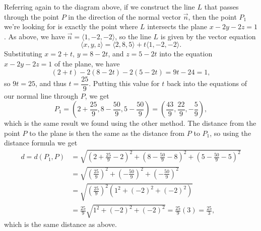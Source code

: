 \documentclass[12pt]{article}
\begin{document}
\begin{enumerate}
\begin{enumerate}
Referring again to the diagram above, if we construct the line $L$ that passes through the point $P$ in the direction of the normal vector $\vec{n}$, then the point $P_1$ we're looking for is exactly the point where $L$ intersects the plane $x-2y-2z=1$. As above, we have $\vec{n} = \langle 1, -2, -2\rangle$, so the line $L$ is given by the vector equation
\[
 \langle x, y, z\rangle = \langle 2, 8, 5\rangle + t\langle 1, -2, -2\rangle.
\]
Substituting $x=2+t$, $y=8-2t$, and $z=5-2t$ into the equation $x-2y-2z=1$ of the plane, we have
\[
 (2+t)-2(8-2t)-2(5-2t) = 9t-24=1,
\]
so $9t=25$, and thus $t=\dfrac{25}{9}$. Putting this value for $t$ back into the equations of our normal line through $P$, we get
\[
 P_1 = \left(2+\frac{25}{9},8-\frac{50}{9}, 5-\frac{50}{9}\right) = \left(\frac{43}{9},\frac{22}{9},-\frac{5}{9}\right),
\]
which is the same result we found using the other method. The distance from the point $P$ to the plane is then the same as the distance from $P$ to $P_1$, so using the distance formula we get
\begin{align*}
 d = d(P_1,P) &= \sqrt{\left(2+\frac{25}{9}-2\right)^2+\left(8-\frac{50}{9} - 8\right)^2 + \left(5-\frac{50}{9}-5\right)^2}\\
& = \sqrt{\left(\frac{25}{9}\right)^2+\left(-\frac{50}{9}\right)^2 + \left(-\frac{50}{9}\right)^2}\\
& = \sqrt{\left(\frac{25}{9}\right)^2(1^2+(-2)^2+(-2)^2)}\\
& = \frac{25}{9}\sqrt{1^2+(-2)^2+(-2)^2} = \frac{25}{9}(3) = \frac{25}{3},
\end{align*}
which is the same distance as above.


\end{enumerate}

\end{enumerate}
  \pagebreak
  
\end{document}
